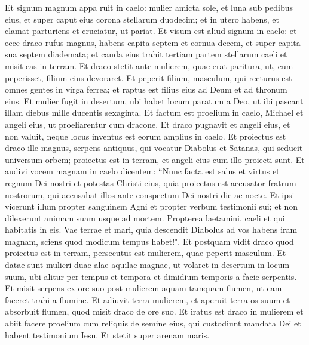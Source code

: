 \begin{biblechapter}  
\verse Et signum magnum appa ruit in caelo: mulier amicta sole, et luna sub pedibus eius, et super caput eius corona stellarum duodecim; 
\verse et in utero habens, et clamat parturiens et cruciatur, ut pariat. 
\verse Et visum est aliud signum in caelo: et ecce draco rufus magnus, habens capita septem et cornua decem, et super capita sua septem diademata; 
\verse et cauda eius trahit tertiam partem stellarum caeli et misit eas in terram. Et draco stetit ante mulierem, quae erat paritura, ut, cum peperisset, filium eius devoraret. 
\verse Et peperit filium, masculum, qui recturus est omnes gentes in virga ferrea; et raptus est filius eius ad Deum et ad thronum eius. 
\verse Et mulier fugit in desertum, ubi habet locum paratum a Deo, ut ibi pascant illam diebus mille ducentis sexaginta. 
\verse Et factum est proelium in caelo, Michael et angeli eius, ut proeliarentur cum dracone. Et draco pugnavit et angeli eius, 
\verse et non valuit, neque locus inventus est eorum amplius in caelo. 
\verse Et proiectus est draco ille magnus, serpens antiquus, qui vocatur Diabolus et Satanas, qui seducit universum orbem; proiectus est in terram, et angeli eius cum illo proiecti sunt. 
\verse Et audivi vocem magnam in caelo dicentem: “Nunc facta est salus et virtus et regnum Dei nostri et potestas Christi eius, quia proiectus est accusator fratrum nostrorum, qui accusabat illos ante conspectum Dei nostri die ac nocte. 
\verse Et ipsi vicerunt illum propter sanguinem Agni et propter verbum testimonii sui; et non dilexerunt animam suam usque ad mortem. 
\verse Propterea laetamini, caeli et qui habitatis in eis. Vae terrae et mari, quia descendit Diabolus ad vos habens iram magnam, sciens quod modicum tempus habet!". 
\verse Et postquam vidit draco quod proiectus est in terram, persecutus est mulierem, quae peperit masculum. 
\verse Et datae sunt mulieri duae alae aquilae magnae, ut volaret in desertum in locum suum, ubi alitur per tempus et tempora et dimidium temporis a facie serpentis. 
\verse Et misit serpens ex ore suo post mulierem aquam tamquam flumen, ut eam faceret trahi a flumine. 
\verse Et adiuvit terra mulierem, et aperuit terra os suum et absorbuit flumen, quod misit draco de ore suo. 
\verse Et iratus est draco in mulierem et abiit facere proelium cum reliquis de semine eius, qui custodiunt mandata Dei et habent testimonium Iesu. 
\verse Et stetit super arenam maris. 
\end{biblechapter}

